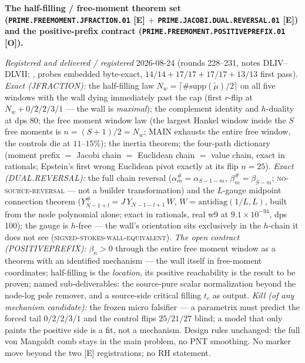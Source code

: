 \documentclass[11pt,a4paper]{article}
\begin{document}
\par\smallskip\noindent\textbf{The half-filling / free-moment
theorem set (\texttt{PRIME.FREEMOMENT.\allowbreak JFRACTION.01}
[E] $+$ \texttt{PRIME.JACOBI.DUAL.\allowbreak REVERSAL.01} [E])
and the positive-prefix contract
(\texttt{PRIME.FREEMOMENT.\allowbreak POSITIVEPREFIX.01} [O]).}
{\sloppy
\emph{Registered and delivered / registered} 2026-08-24 (rounds
228--231, notes DLIV--DLVII;
, probes
embedded byte-exact, $14/14 + 17/17 + 17/17 + 13/13$ first
pass).  \emph{Exact (JFRACTION):} the half-filling law $N_w =
\lceil \#\mathrm{supp}(\tilde\mu)/2 \rceil$ on all five windows
with the wall dying immediately past the cap (first $r$-flip at
$N_w + 0/2/2/3/1$ --- the wall is \emph{maximal}); the
complement identity and $h$-duality at dps 80; the free moment
window law (the largest Hankel window inside the $S$ free
moments is $n = (S+1)/2 = N_w$; MAIN exhausts the entire free
window, the controls die at $11$--$15\%$); the inertia theorem;
the four-path dictionary (moment prefix $=$ Jacobi chain $=$
Euclidean chain $=$ value chain, exact in rationals; Epstein's
first wrong Euclidean pivot exactly at its flip $n = 25$).
\emph{Exact (DUAL.REVERSAL):} the full chain reversal
($\alpha^{\#}_m = \alpha_{S-1-m}$, $\beta^{\#}_m =
\beta_{S-m}$; \textsc{no-source-reversal} --- not a builder
transformation) and the $L$-gauge midpoint connection theorem
($Y^{\#}_{N-1+l} = J\,Y_{N-1-l+1}\,W$, $W =
\mathrm{antidiag}(1/L, L)$, built from the node polynomial
alone; exact in rationals, real w9 at $9.1\times10^{-94}$, dps
100); the gauge is $h$-free --- the wall's orientation sits
exclusively in the $h$-chain it does not see
(\textsc{signed-stokes-wall-equivalent}).  \emph{The open
contract (POSITIVEPREFIX):} $\beta_n > 0$ through the entire
free moment window as a theorem with an identified mechanism ---
the wall itself in free-moment coordinates; half-filling is the
\emph{location}, its positive reachability is the result to be
proven; named sub-deliverables: the source-pure scalar
normalization beyond the node-log pole remover, and a
source-side critical filling $t_c$ as output.  \emph{Kill (of
any mechanism candidate):} the frozen micro falsifier --- a
parametrix must predict the forced tail $0/2/2/3/1$ and the
control flips $25/21/27$ blind; a model that only paints the
positive side is a fit, not a mechanism.  Design rules
unchanged: the full von Mangoldt comb stays in the main
problem, no PNT smoothing.  No marker move beyond the two [E]
registrations; no RH statement.\par}
\end{document}
